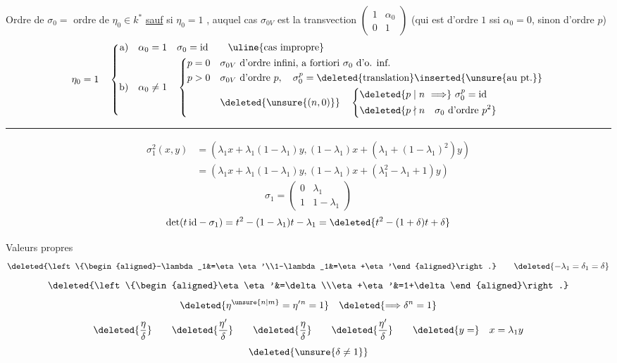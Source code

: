 Ordre de $\sigma_0=$ ordre de $\eta_0\in k^*$ \uline{sauf} si $\eta_0=1$ , auquel cas $\sigma_{0V}$ est la transvection
$\begin{pmatrix}1&\alpha_0\\0&1\end{pmatrix}$
(qui est d'ordre $1$ ssi $\alpha_0=0$, sinon d'ordre $p$)
\[
\eta_0=1\quad\left\{\begin{aligned}
\text{a)}\quad&\alpha_0=1\quad\sigma_0=\mathrm{id}\qquad\text{\uline{cas impropre}}\\
\text{b)}\quad&\alpha_0\ne1\quad\left\{\begin{aligned}
p=0\quad&\sigma_{0V}\text{ d'ordre infini, a fortiori }\sigma_0\text{ d'o. inf.}\\
p>0\quad&\sigma_{0V}\text{ d'ordre }p,\quad\sigma_0^p=\deleted{\text{translation}}\inserted{\text{\unsure{au pt.}}}\\
&\deleted{\unsure{(n,0)}}\quad\left\{\begin{aligned}
&\deleted{p\mid n\ \Longrightarrow}\ \sigma_0^p=\mathrm{id}\\
&\deleted{p\nmid n\quad\sigma_0\text{ d'ordre }p^2}
\end{aligned}\right.
\end{aligned}\right.
\end{aligned}\right.
\]
\par\noindent\rule{.4\linewidth}{.4pt}\par
\[
\begin{aligned}
\sigma_1^2(x,y)&=(\lambda_1x+\lambda_1(1-\lambda_1)y,(1-\lambda_1)x+(\lambda_1+(1-\lambda_1)^2)y)\\
&=(\lambda_1x+\lambda_1(1-\lambda_1)y,(1-\lambda_1)x+(\lambda_1^2-\lambda_1+1)y)
\end{aligned}
\]
\[
\sigma_1=\begin{pmatrix}0&\lambda_1\\1&1-\lambda_1\end{pmatrix}
\]
\[
\det(t\,\mathrm{id}-\sigma_1)=t^2-(1-\lambda_1)t-\lambda_1
=\deleted{t^2-(1+\delta)t+\delta}
\]

Valeurs propres 
\[
\deleted{\left\{\begin{aligned}-\lambda_1&=\eta\eta'\\1-\lambda_1&=\eta+\eta'\end{aligned}\right.}
\qquad\deleted{-\lambda_1=\delta_1=\delta}
\]
\[
\deleted{\left\{\begin{aligned}\eta\eta'&=\delta\\\eta+\eta'&=1+\delta\end{aligned}\right.}
\]
\[
\deleted{\eta^{\unsure{n|m}}=\eta'{}^n=1}\quad\deleted{\Longrightarrow\delta^n=1}
\]
\[
\deleted{\frac{\eta}{\delta}}\qquad\deleted{\frac{\eta'}{\delta}}\qquad
\deleted{\frac{\eta}{\delta}}\qquad\deleted{\frac{\eta'}{\delta}}\qquad
\deleted{y=}\quad x=\lambda_1y
\]
\[
\deleted{\unsure{\delta\ne1}}
\]

